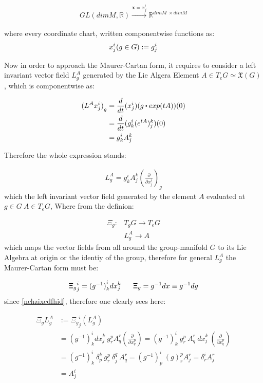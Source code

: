 \documentclass[8pt, twocoloumn]{article}
\begin{document}
\begin{align}
    GL(dimM, \mathbb{R}) \overset{\textbf{x} = x^i_j}{\to} \mathbb{R}^{dim M \ \times dimM}
\end{align}

where every coordinate chart, written componentwise functions as: 
\begin{align}{\label{nchzixcdfhid}}
x^i_j(g \in G) := g^i_j
\end{align}

Now in order to approach the Maurer-Cartan form, it requires to consider a left invariant vector field $L^A_g$ generated by the Lie Algera Element $A \in T_eG \simeq \mathfrak{X}(G)$, which is componentwise as:


\begin{align}
    {(L^A x^i_j)}_g &= \frac{d}{dt}{(x^i_j)(g \sbullet exp{(tA)})}(0) \\ 
    &= \frac{d}{dt}{(g^i_k (e^{tA})^k_j)}(0) \\ 
    &= g^i_k A^k_j
\end{align}

Therefore the whole expression stands:

\begin{align}
    L^A_g = g^i_k A^k_j {(\frac{\partial}{\partial x^i_j})}_g
\end{align}
which the left invariant vector field generated by the element $A$ evaluated at $g\in G \ A \in T_eG$, Where from the definion: 

\begin{align}
    \mathsf{\Xi}_{g}:& T_gG \to T_eG \\ 
    & L^A_g \to A
\end{align}
which maps the vector fields from all around the group-manifold $G$ to its Lie Algebra at origin or the identiy of the group, therefore for general $L^A_g$ the Maurer-Cartan form must be:

\begin{align}{\label{coordinatedecomposition}}
  {\mathsf{\Xi}_{g} }^i_j = {(g^{-1})}^i_k {dx}^k_j \ \ \ \ \  {\mathsf{\Xi}_{g} }= g^{-1}dx \equiv g^{-1}dg
\end{align}
since \ref{nchzixcdfhid}, therefore one clearly sees here:

\begin{align}
    {\mathsf{\Xi}_{g} }L^A_g & := {\mathsf{\Xi}_{g} }^i_j {(L^A_g)} \\ 
    &= {(g^{-1})}^i_k {dx}^k_j \  g^p_r A^r_q {(\frac{\partial}{\partial x^p_q})} = {(g^{-1})}^i_k \ g^p_r \ A^r_q \  {dx}^k_j \ {(\frac{\partial}{\partial x^p_q})} \\ 
    &= {(g^{-1})}^i_k \ \delta^{k}_{p} \ g^p_r \ \delta^{q}_{j} \ A^r_q  = {(g^{-1})}^i_p  \  {(g)}^p_r  A^r_j = \delta^{i}_{r}A^r_j \\ 
   & = A^i_j 
\end{align}
\end{document}
